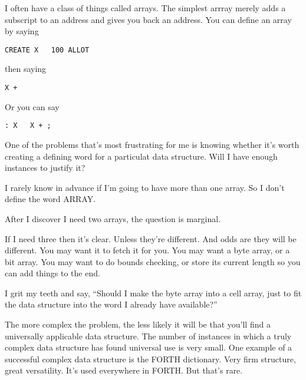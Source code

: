 \documentclass{book}
\begin{document}
\begin{list}{}{}

\item
I often have a class of things called arrays. The simplest arrray merely adds a subscript to an address and gives you back an address. You can define an array by saying

\item
\begin{verbatim}
CREATE X   100 ALLOT
\end{verbatim}

\item
then saying

\item
\begin{verbatim}
X +
\end{verbatim}

\item
Or you can say

\item
\begin{verbatim}
: X   X + ;
\end{verbatim}

\item
One of the problems that's most frustrating for me is knowing whether it's worth creating a defining word for a particulat data structure. Will I have enough instances to justify it?

\item
I rarely know in advance if I'm going to have more than one array. So I don't define the word ARRAY.

\item
After I discover I need two arrays, the question is marginal.

\item
If I need three then it's clear. Unless they're different. And odds are they will be different. You may want it to fetch it for you. You may want a byte array, or a bit array. You may want to do bounds checking, or store its current length so you can add things to the end.

\item
I grit my teeth and say, ``Should I make the byte array into a cell array, just to fit the data structure into the word I already have available?''

\item
The more complex the problem, the less likely it will be that you'll find a universally applicable data structure. The number of instances in which a truly complex data structure has found universal use is very small. One example of a successful complex data structure is the FORTH dictionary. Very firm structure, great versatility. It's used everywhere in FORTH. But that's rare.


\end{list}
\end{document}
